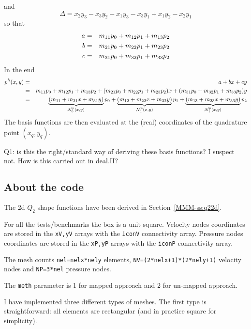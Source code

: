 and
\[
\Delta = x_2y_3-x_3y_2 - x_1y_3-x_3y_1 + x_1y_2-x_2y_1
\]
so that
\begin{eqnarray}
a &=& m_{11}p_0 + m_{12} p_1 + m_{13} p_2 \nonumber\\
b &=& m_{21}p_0 + m_{22} p_1 + m_{23} p_2 \nonumber\\
c &=& m_{31}p_0 + m_{32} p_1 + m_{33} p_2 \nonumber
\end{eqnarray}
In the end 
\begin{eqnarray}
p^h(x,y) 
&=&  a+bx+cy \nonumber\\
&=& m_{11}p_0 + m_{12} p_1 + m_{13} p_2
+ ( m_{21}p_0 + m_{22} p_1 + m_{23} p_2) x
+ ( m_{31}p_0 + m_{32} p_1 + m_{33} p_2) y \nonumber\\
&=& \underbrace{(m_{11} + m_{21}x + m_{31}y)}_{{\mathcal{N}}_0^p(x,y)} p_0 
+   \underbrace{(m_{12} + m_{22}x + m_{32}y)}_{{\mathcal{N}}_1^p(x,y)} p_1 
+   \underbrace{(m_{13} + m_{23}x + m_{33}y)}_{{\mathcal{N}}_1^p(x,y)} p_2
\label{f76_NNNP}
\end{eqnarray}
The basis functions are then evaluated at the (real) coordinates 
of the quadrature point $(x_q,y_q)$.

{\color{red} Q1: is this the right/standard way of deriving these 
basis functions? I suspect not. How is this carried out in deal.II?}





\subsection*{About the code}


The 2d $Q_2$ shape functions have been derived in Section~\ref{MMM-ss:q22d}.

For all the tests/benchmarks the box is a unit square.
Velocity nodes coordinates are stored in the \lstinline{xV,yV} arrays
with the \lstinline{iconV} connectivity array.
Pressure nodes coordinates are stored in the \lstinline{xP,yP} arrays
with the \lstinline{iconP} connectivity array.

The mesh counts \lstinline{nel=nelx*nely} elements,
\lstinline{NV=(2*nelx+1)*(2*nely+1)} velocity nodes and 
\lstinline{NP=3*nel} pressure nodes.

The \lstinline{meth} parameter is 1 for mapped approach and 2 
for un-mapped approach. 

I have implemented three different types of meshes. 
The first type is straightforward: all elements are rectangular (and in 
practice square for simplicity).


